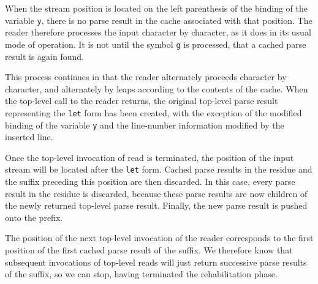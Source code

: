 When the stream position is located on the left parenthesis of the
binding of the variable \texttt{y}, there is no parse result in the
cache associated with that position.  The reader therefore processes
the input character by character, as it does in its usual mode of
operation.  It is not until the symbol \texttt{g} is processed, that a
cached parse result is again found.

This process continues in that the reader alternately proceeds
character by character, and alternately by leaps according to the
contents of the cache.  When the top-level call to the reader returns,
the original top-level parse result representing the \texttt{let} form
has been created, with the exception of the modified binding of the
variable \texttt{y} and the line-number information modified by the
inserted line.

Once the top-level invocation of read is terminated, the position of
the input stream will be located after the \texttt{let} form.  Cached
parse results in the residue and the suffix preceding this position
are then discarded.  In this case, every parse result in the residue
is discarded, because these parse results are now children of the
newly returned top-level parse result.  Finally, the new parse result
is pushed onto the prefix.

The position of the next top-level invocation of the reader
corresponds to the first position of the first cached parse result of
the suffix.  We therefore know that subsequent invocations of
top-level reads will just return successive parse results of the
suffix, so we can stop, having terminated the rehabilitation phase.
